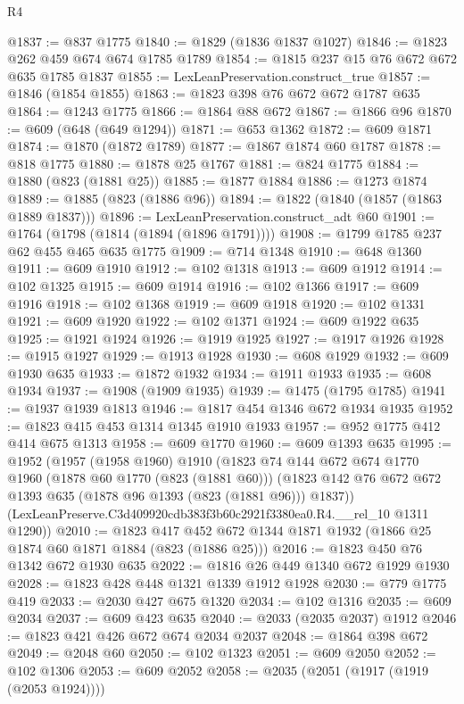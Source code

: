 \begin{lexlean}{R4}
\begin{coremodule}
@1837 := @837 @1775
@1840 := @1829 (@1836 @1837 @1027)
@1846 := @1823 @262 @459 @674 @674 @1785 @1789
@1854 := @1815 @237 @15 @76 @672 @672 @635 @1785 @1837
@1855 := LexLeanPreservation.construct_true
@1857 := @1846 (@1854 @1855)
@1863 := @1823 @398 @76 @672 @672 @1787 @635
@1864 := @1243 @1775
@1866 := @1864 @88 @672
@1867 := @1866 @96
@1870 := @609 (@648 (@649 @1294))
@1871 := @653 @1362
@1872 := @609 @1871
@1874 := @1870 (@1872 @1789)
@1877 := @1867 @1874 @60 @1787
@1878 := @818 @1775
@1880 := @1878 @25 @1767
@1881 := @824 @1775
@1884 := @1880 (@823 (@1881 @25))
@1885 := @1877 @1884
@1886 := @1273 @1874
@1889 := @1885 (@823 (@1886 @96))
@1894 := @1822 (@1840 (@1857 (@1863 @1889 @1837)))
@1896 := LexLeanPreservation.construct_adt @60
@1901 := @1764 (@1798 (@1814 (@1894 (@1896 @1791))))
@1908 := @1799 @1785 @237 @62 @455 @465 @635 @1775
@1909 := @714 @1348
@1910 := @648 @1360
@1911 := @609 @1910
@1912 := @102 @1318
@1913 := @609 @1912
@1914 := @102 @1325
@1915 := @609 @1914
@1916 := @102 @1366
@1917 := @609 @1916
@1918 := @102 @1368
@1919 := @609 @1918
@1920 := @102 @1331
@1921 := @609 @1920
@1922 := @102 @1371
@1924 := @609 @1922 @635
@1925 := @1921 @1924
@1926 := @1919 @1925
@1927 := @1917 @1926
@1928 := @1915 @1927
@1929 := @1913 @1928
@1930 := @608 @1929
@1932 := @609 @1930 @635
@1933 := @1872 @1932
@1934 := @1911 @1933
@1935 := @608 @1934
@1937 := @1908 (@1909 @1935)
@1939 := @1475 (@1795 @1785)
@1941 := @1937 @1939 @1813
@1946 := @1817 @454 @1346 @672 @1934 @1935
@1952 := @1823 @415 @453 @1314 @1345 @1910 @1933
@1957 := @952 @1775 @412 @414 @675 @1313
@1958 := @609 @1770
@1960 := @609 @1393 @635
@1995 := @1952
    (@1957
      (@1958 @1960)
      @1910
      (@1823
        @74
        @144
        @672
        @674
        @1770
        @1960
        (@1878 @60 @1770 (@823 (@1881 @60)))
        (@1823 @142 @76 @672 @672 @1393 @635 (@1878 @96 @1393 (@823 (@1881 @96))) @1837))
      (LexLeanPreserve.C3d409920cdb383f3b60c2921f3380ea0.R4.__rel_10 @1311 @1290))
@2010 := @1823 @417 @452 @672 @1344 @1871 @1932 (@1866 @25 @1874 @60 @1871 @1884 (@823 (@1886 @25)))
@2016 := @1823 @450 @76 @1342 @672 @1930 @635
@2022 := @1816 @26 @449 @1340 @672 @1929 @1930
@2028 := @1823 @428 @448 @1321 @1339 @1912 @1928
@2030 := @779 @1775 @419
@2033 := @2030 @427 @675 @1320
@2034 := @102 @1316
@2035 := @609 @2034
@2037 := @609 @423 @635
@2040 := @2033 (@2035 @2037) @1912
@2046 := @1823 @421 @426 @672 @674 @2034 @2037
@2048 := @1864 @398 @672
@2049 := @2048 @60
@2050 := @102 @1323
@2051 := @609 @2050
@2052 := @102 @1306
@2053 := @609 @2052
@2058 := @2035 (@2051 (@1917 (@1919 (@2053 @1924))))

\end{coremodule}
\end{lexlean}
